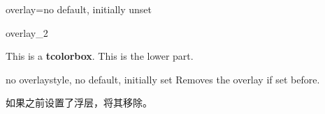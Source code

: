 \begin{docTcbKey}{overlay}{=}{no default, initially unset}
\begin{exdispExample}{overlay_2}
\begin{tcolorbox}[ribbonbox,title=My title]
This is a \textbf{tcolorbox}.
\tcblower
This is the lower part.
\end{tcolorbox}
\end{exdispExample}
\end{docTcbKey}




\begin{docTcbKey}{no overlay}{}{style, no default, initially set}
 Removes the overlay if set before.

如果之前设置了浮层，将其移除。
\end{docTcbKey}